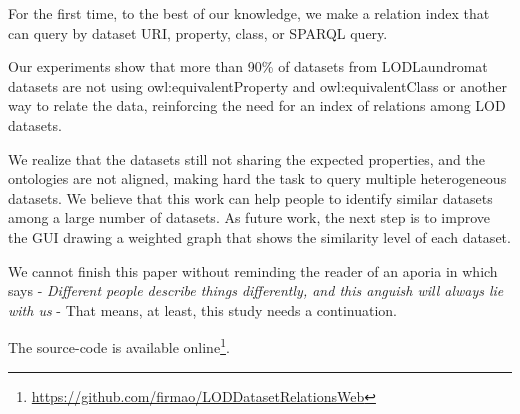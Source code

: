 \documentclass[sw]{iosart2x}
\begin{document}
For the first time, to the best of our knowledge, we make a relation index that can query by dataset URI, property, class, or SPARQL query.

Our experiments show that more than 90\% of datasets from LODLaundromat datasets are not using owl:equivalentProperty and owl:equivalentClass or another way to relate the data, reinforcing the need for an index of relations among LOD datasets.

We realize that the datasets still not sharing the expected properties, and the ontologies are not aligned, making hard the task to query multiple heterogeneous datasets.
We believe that this work can help people to identify similar datasets among a large number of datasets.
As future work, the next step is to improve the GUI drawing a weighted graph that shows the similarity level of each dataset.

We cannot finish this paper without reminding the reader of an aporia in which says - \textit{Different people describe things differently, and this anguish will always lie with us} - That means, at least, this study needs a continuation.

The source-code is available online\footnote{\url{https://github.com/firmao/LODDatasetRelationsWeb}}.

\end{document}
